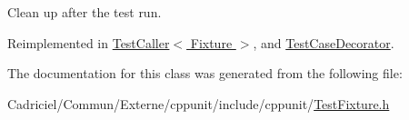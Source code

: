 Clean up after the test run. 



Reimplemented in \hyperlink{class_test_caller_a0e463b88bf0ceacbd8875e0450ed2649}{Test\-Caller$<$ Fixture $>$}, and \hyperlink{class_test_case_decorator_adc3ee82fb758f39b5781624090af449d}{Test\-Case\-Decorator}.



The documentation for this class was generated from the following file\-:\begin{DoxyCompactItemize}
\item 
Cadriciel/\-Commun/\-Externe/cppunit/include/cppunit/\hyperlink{_test_fixture_8h}{Test\-Fixture.\-h}\end{DoxyCompactItemize}
